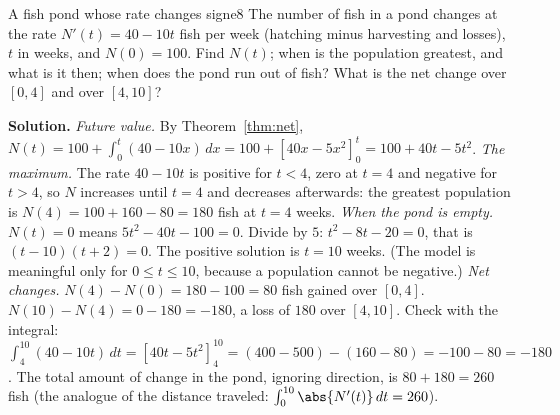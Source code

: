 \documentclass[11pt]{article}
\begin{document}
\begin{exmp}{A fish pond whose rate changes sign}{e8}
The number of fish in a pond changes at the rate $N'(t)=40-10t$ fish per week (hatching minus harvesting and losses), $t$ in weeks, and $N(0)=100$. Find $N(t)$; when is the population greatest, and what is it then; when does the pond run out of fish? What is the net change over $[0,4]$ and over $[4,10]$?

\textbf{Solution.} \emph{Future value.} By Theorem~\ref{thm:net}, $N(t)=100+\int_0^t(40-10x)\,dx=100+\left[40x-5x^2\right]_0^t=100+40t-5t^2$.
\emph{The maximum.} The rate $40-10t$ is positive for $t<4$, zero at $t=4$ and negative for $t>4$, so $N$ increases until $t=4$ and decreases afterwards: the greatest population is $N(4)=100+160-80=180$ fish at $t=4$ weeks.
\emph{When the pond is empty.} $N(t)=0$ means $5t^2-40t-100=0$. Divide by $5$: $t^2-8t-20=0$, that is $(t-10)(t+2)=0$. The positive solution is $t=10$ weeks. (The model is meaningful only for $0\le t\le10$, because a population cannot be negative.)
\emph{Net changes.} $N(4)-N(0)=180-100=80$ fish gained over $[0,4]$. $N(10)-N(4)=0-180=-180$, a loss of $180$ over $[4,10]$. Check with the integral: $\int_4^{10}(40-10t)\,dt=\left[40t-5t^2\right]_4^{10}=(400-500)-(160-80)=-100-80=-180$. \checkmark
The total amount of change in the pond, ignoring direction, is $80+180=260$ fish (the analogue of the distance traveled: $\int_0^{10}\abs{N'(t)}\,dt=260$).
\end{exmp}
\end{document}
